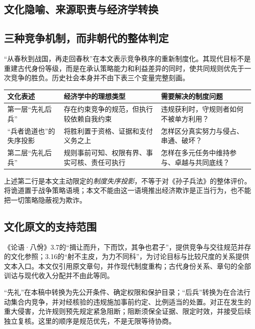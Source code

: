 \documentclass[12pt,a4paper,openany]{report}
\begin{document}
\begin{CJK*}{UTF8}{gkai}
\chapter{文化隐喻、来源职责与经济学转换}
\label{chap:metaphor}
\section{三种竞争机制，而非朝代的整体判定}
“从春秋到战国，再走回春秋”在本文表示竞争秩序的重新制度化。其现代目标不是重建古代身份等级，而是在承认策略能力和利益差异的同时，使共同规则优先于一次竞争的胜负。历史社会本身并不由下表三个变量完整刻画。
\begin{center}\small
\begin{tabular}{L{0.19\textwidth}L{0.34\textwidth}L{0.36\textwidth}}
\toprule 文化表述 & 经济学中的理想类型 & 需要解决的制度问题\\\midrule
第一层“先礼后兵” & 存在约束竞争的规范，但执行较依赖自我约束 & 违规获利时，守规则者如何不被单方利用？\\
“兵者诡道也”的失序投影 & 将胜利置于资格、证据和支付义务之上 & 怎样区分真实努力与侵占、串通、破坏？\\
第二层“先礼后兵” & 规则事前可知、权限有界、事实可核、责任可执行 & 怎样在多元任务中维持参与、卓越与共同底线？\\
\bottomrule
\end{tabular}
\end{center}
上述第二行是本文主动限定的\emph{制度失序投影}，不等于对《孙子兵法》的整体评价。\cite[始计对应章第18节]{SunTzu}将诡道置于战争策略语境；本文不能由这一语境推出经济欺诈是正当行为，也不能把一切策略隐蔽视为欺诈。

\section{文化原文的支持范围}
《论语·八佾》3.7的“揖让而升，下而饮，其争也君子”，提供竞争与交往规范并存的文化参照；3.16的“射不主皮，为力不同科”，为讨论目标与比较尺度的关系提供文本入口\cite{Analects37,Analects316}。本文仅引用原文章句，并作现代制度重构；古代身份关系、章句的全部训诂与现代收入分配并不由此等同。

“先礼”在本稿中转换为先公开条件、确定权限和保护目录；“后兵”转换为在合法行动集合内竞争，并对经核验的违规施加事前约定、比例适当的处置。对正在发生的重大侵害，允许规则预先规定紧急阻断；阻断须保全证据、限定时效，并接受后续独立复核。这里的顺序是规范优先，不是无限等待协商。


\end{CJK*}
\end{document}
